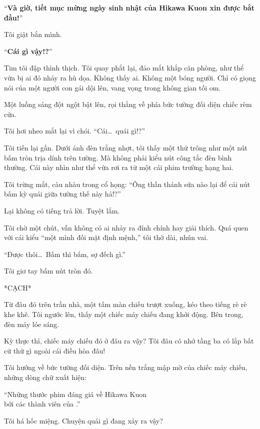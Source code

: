 \documentclass[../main.tex]{subfiles}
\begin{document}
\begin{center}
    ``\textbf{Và giờ, tiết mục mừng ngày sinh nhật của Hikawa Kuon xin được bắt đầu!}''
\end{center}

Tôi giật bắn mình.

``\textbf{Cái gì vậy!?}''

Tim tôi đập thình thịch. Tôi quay phắt lại, đảo mắt khắp căn phòng, như thể vừa bị ai đó nhảy ra hù dọa. Không thấy ai. Không một bóng người. Chỉ có giọng nói của một người con gái dội lên, vang vọng trong không gian tối om.

Một luồng sáng đột ngột bật lên, rọi thẳng về phía bức tường đối diện chiếc rèm cửa.

Tôi hơi nheo mắt lại vì chói. ``Cái\dots\ quái gì!?''

Tôi tiến lại gần. Dưới ánh đèn trắng nhợt, tôi thấy một thứ trông như một nút bấm tròn trịa dính trên tường. Mà không phải kiểu nút công tắc đèn bình thường. Cái này nhìn như thể vừa rơi ra từ một cái phim trường hạng hai.

Tôi trừng mắt, càu nhàu trong cổ họng: ``Ông thần thánh sứa nào lại để cái nút bấm kỳ quái giữa tường thế này hả!?''

Lại không có tiếng trả lời. Tuyệt lắm.

Tôi chờ một chút, vẫn không có ai nhảy ra đính chính hay giải thích. Quá quen với cái kiểu ``một mình đối mặt định mệnh,'' tôi thở dài, nhún vai.

``Được thôi\dots\ Bấm thì bấm, sợ đếch gì.''

Tôi giơ tay bấm nút tròn đó.

*CẠCH*

Từ đâu đó trên trần nhà, một tấm màn chiếu trượt xuống, kéo theo tiếng rè rè khe khẽ. Tôi ngước lên, thấy một chiếc máy chiếu đang khởi động. Bên trong, đèn máy lóe sáng.

Kỳ thực thì, chiếc máy chiếu đó ở đâu ra vậy? Tôi đâu có nhớ tầng ba có lắp bất cứ thứ gì ngoài cái điều hòa đâu!

Tôi hướng về bức tường đối diện. Trên nền trắng mập mờ của chiếc máy chiếu, những dòng chữ xuất hiện:

\begin{center}
    ``Những thước phim đáng giá về Hikawa Kuon \\ bởi các thành viên của \hll.''
\end{center}

Tôi há hốc miệng. Chuyện quái gì đang xảy ra vậy?
\end{document}
